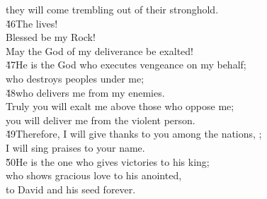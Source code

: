 \begin{poetry}
\poemll    they will come trembling out of their stronghold. \\
\poeml \v{46}The  lives! \\
\poemll    Blessed be my Rock! \\
\poemlll       May the God of my deliverance be exalted! \\
\poeml \v{47}He is the God who executes vengeance on my behalf; \\
\poemll    who destroys peoples under me; \\
\poeml \v{48}who delivers me from my enemies. \\
\poemll    Truly you will exalt me above those who oppose me; \\
\poemlll       you will deliver me from the violent person. \\
\poeml \v{49}Therefore, I will give thanks to you among the nations, ; \\
\poemll    I will sing praises to your name. \\
\poeml \v{50}He is the one who gives victories to his king; \\
\poemll    who shows gracious love to his anointed, \\
\poemlll       to David and his seed forever.
\end{poetry}

